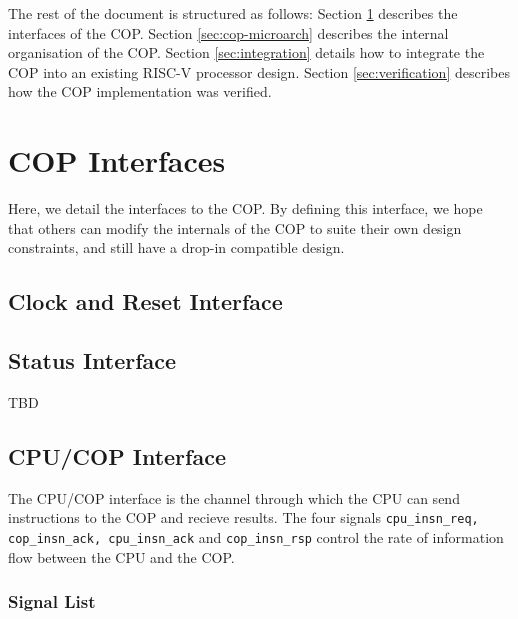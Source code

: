 \documentclass{article}
\begin{document}
The rest of the document is structured as follows: Section 
\ref{sec:cop-interfaces} describes the interfaces of the COP. Section
\ref{sec:cop-microarch} describes the internal organisation of the COP.
Section \ref{sec:integration} details how to integrate the COP into an
existing RISC-V processor design. Section \ref{sec:verification} describes
how the COP implementation was verified.

\section{COP Interfaces}
\label{sec:cop-interfaces}

Here, we detail the interfaces to the COP. By defining this interface, we
hope that others can modify the internals of the COP to suite their own
design constraints, and still have a drop-in compatible design.

\subsection{Clock and Reset Interface}
\label{sec:if-clk-reset}


\subsection{Status Interface}

TBD

\subsection{CPU/COP Interface}

The CPU/COP interface is the channel through which the CPU can send
instructions to the COP and recieve results.
The four signals
{\tt cpu\_insn\_req, cop\_insn\_ack, cpu\_insn\_ack} and
{\tt cop\_insn\_rsp}
control the rate of information flow between the CPU and the COP.

\subsubsection{Signal List}
\end{document}
